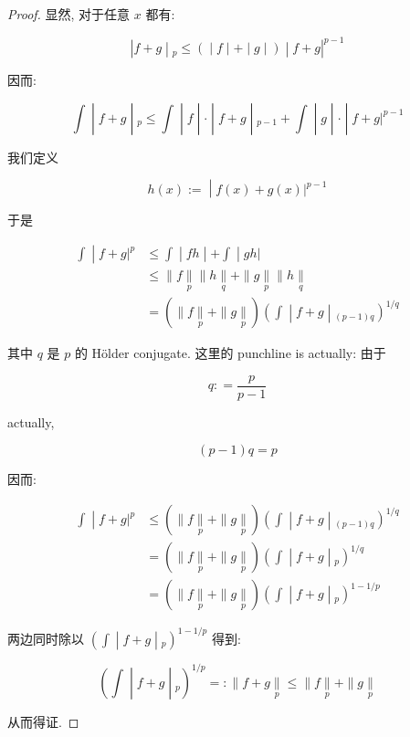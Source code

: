 \documentclass{qlnotes-export}
\begin{document}
\begin{proof}

显然, 对于任意 \(x\) 都有:

\[\left. |f + g \middle| {}_{p} \leq ( \middle| f \middle| + \middle| g \middle| ) \middle| f + g|^{p - 1} \right.\]

因而:

\[\left. \int \middle| f + g \middle| {}_{p} \leq \int \middle| f \middle| \cdot \middle| f + g \middle| {}_{p - 1} + \int \middle| g \middle| \cdot \middle| f + g|^{p - 1} \right.\]

我们定义

\[\left. h(x) := \middle| f(x) + g(x)|^{p - 1} \right.\]

于是

\[\begin{matrix}
\left. \int \middle| f + g|^{p} \right. & \left. \leq \int \middle| fh \middle| + \int \middle| gh| \right. \\
 & {\leq \parallel f\underset{p}{\parallel} \parallel h\underset{q}{\parallel} + \parallel g\underset{p}{\parallel} \parallel h\underset{q}{\parallel}} \\
 & \left. = ( \parallel f\underset{p}{\parallel} + \parallel g\underset{p}{\parallel})(\int \middle| f + g \middle| {}_{(p - 1)q})^{1/q} \right.
\end{matrix}\]

其中 \(q\) 是 \(p\) 的 Hölder conjugate. 这里的 punchline is actually: 由于

\[q: = \frac{p}{p - 1}\]

actually,

\[(p - 1)q = p\]

因而:

\[\begin{matrix}
\left. \int \middle| f + g|^{p} \right. & \left. \leq ( \parallel f\underset{p}{\parallel} + \parallel g\underset{p}{\parallel})(\int \middle| f + g \middle| {}_{(p - 1)q})^{1/q} \right. \\
 & \left. = ( \parallel f\underset{p}{\parallel} + \parallel g\underset{p}{\parallel})(\int \middle| f + g \middle| {}_{p})^{1/q} \right. \\
 & \left. = ( \parallel f\underset{p}{\parallel} + \parallel g\underset{p}{\parallel})(\int \middle| f + g \middle| {}_{p})^{1 - 1/p} \right.
\end{matrix}\]

两边同时除以 \(\left. (\int \middle| f + g \middle| {}_{p})^{1 - 1/p} \right.\) 得到:

\[\left. (\int \middle| f + g \middle| {}_{p})^{1/p} = : \parallel f + g\underset{p}{\parallel} \leq \parallel f\underset{p}{\parallel} + \parallel g\underset{p}{\parallel} \right.\]

从而得证.

\end{proof}
\end{document}
